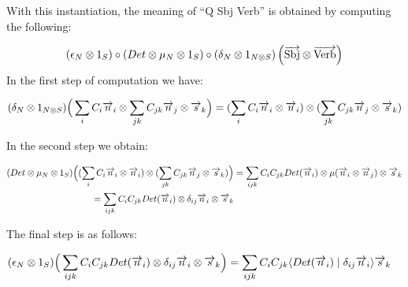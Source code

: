 With this instantiation, the  meaning of ``Q Sbj Verb'' is obtained by computing the following:

\[
(\epsilon_N \otimes 1_S) \circ (Det \otimes  \mu_N \otimes 1_S) \circ (\delta_N \otimes 1_{N \otimes S})\left(\overrightarrow{\text{Sbj}} \otimes \overrightarrow{\text{Verb}}\right)
\]
In the first step of computation we have:

\begin{align*}
(\delta_N \otimes 1_{N \otimes S})\Big(\sum_i C_i \overrightarrow{n}_i \otimes \sum_{jk} C_{jk} \overrightarrow{n}_j \otimes \overrightarrow{s}_k\Big) = 
(\sum_i C_i \overrightarrow{n}_i \otimes \overrightarrow{n}_i) \otimes  (\sum_{jk} C_{jk} \overrightarrow{n}_j \otimes \overrightarrow{s}_k)
\end{align*}

\noindent
In the second step we obtain: 

\begin{align*}
(Det \otimes  \mu_N \otimes 1_S)\Big((\sum_i C_i \overrightarrow{n}_i \otimes \overrightarrow{n}_i) \otimes  (\sum_{jk} C_{jk} \overrightarrow{n}_j \otimes \overrightarrow{s}_k)\Big) &= 
\sum_{ijk} C_i C_{jk} Det(\overrightarrow{n}_i) \otimes \mu(\overrightarrow{n}_i \otimes \overrightarrow{n}_j) \otimes \overrightarrow{s}_k \\
= \sum_{ijk} C_i C_{jk} Det(\overrightarrow{n}_i) \otimes \delta_{ij} \overrightarrow{n}_i \otimes \overrightarrow{s}_k&
\end{align*}

\noindent
The final step is as follows:

\begin{align*}
(\epsilon_{N} \otimes 1_S)  \Big(\sum_{ijk} C_i C_{jk} Det(\overrightarrow{n}_i) \otimes \delta_{ij} \overrightarrow{n}_i \otimes \overrightarrow{s}_k \Big) &=   
\sum_{ijk} C_i C_{jk} \langle Det(\overrightarrow{n}_i) \mid \delta_{ij} \overrightarrow{n}_i \rangle \overrightarrow{s}_k
\end{align*}


